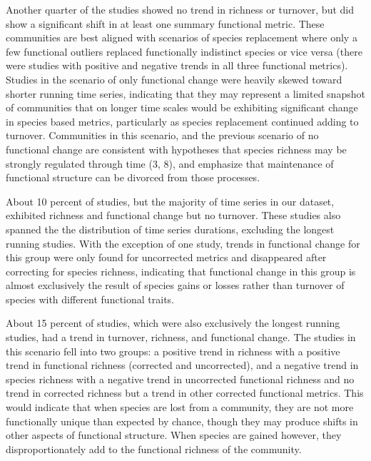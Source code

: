 \documentclass{article}
\begin{document}
Another quarter of the studies showed no trend in richness or turnover,
but did show a significant shift in at least one summary functional
metric. These communities are best aligned with scenarios of species
replacement where only a few functional outliers replaced functionally
indistinct species or vice versa (there were studies with positive and
negative trends in all three functional metrics). Studies in the
scenario of only functional change were heavily skewed toward shorter
running time series, indicating that they may represent a limited
snapshot of communities that on longer time scales would be exhibiting
significant change in species based metrics, particularly as species
replacement continued adding to turnover. Communities in this scenario,
and the previous scenario of no functional change are consistent with
hypotheses that species richness may be strongly regulated through time
(3, 8), and emphasize that maintenance of functional structure can be
divorced from those processes.

About 10 percent of studies, but the majority of time series in our
dataset, exhibited richness and functional change but no turnover. These
studies also spanned the the distribution of time series durations,
excluding the longest running studies. With the exception of one study,
trends in functional change for this group were only found for
uncorrected metrics and disappeared after correcting for species
richness, indicating that functional change in this group is almost
exclusively the result of species gains or losses rather than turnover
of species with different functional traits.

About 15 percent of studies, which were also exclusively the longest
running studies, had a trend in turnover, richness, and functional
change. The studies in this scenario fell into two groups: a positive
trend in richness with a positive trend in functional richness
(corrected and uncorrected), and a negative trend in species richness
with a negative trend in uncorrected functional richness and no trend in
corrected richness but a trend in other corrected functional metrics.
This would indicate that when species are lost from a community, they
are not more functionally unique than expected by chance, though they
may produce shifts in other aspects of functional structure. When
species are gained however, they disproportionately add to the
functional richness of the community.
\end{document}
